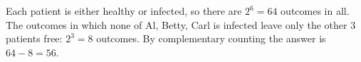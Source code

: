 Each patient is either healthy or infected, so there are $2^6=64$ outcomes in all. The outcomes in which none of Al, Betty, Carl is infected leave only the other $3$ patients free: $2^3=8$ outcomes. By complementary counting the answer is $64-8=\boxed{56}$.
